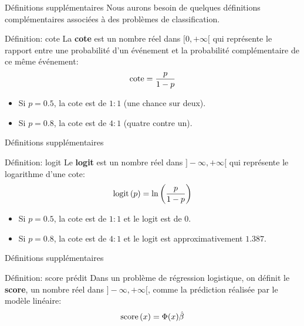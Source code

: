 \begin{frame}{Définitions supplémentaires}
	Nous aurons besoin de quelques définitions complémentaires associées à des problèmes de classification.
	\begin{block}{Définition: cote}
		La \textbf{cote} est un nombre réel dans $[0, +\infty[$ qui représente le rapport entre une probabilité d'un événement et la probabilité complémentaire de ce même événement:
		\begin{equation}
			\operatorname{cote} = \frac{p}{1 - p}
			\nonumber
		\end{equation}
	\end{block}
	\pause
	\begin{itemize}
		\item Si $p=0.5$, la cote est de $1:1$ (une chance sur deux).
		\item Si $p=0.8$, la cote est de $4:1$ (quatre contre un).
	\end{itemize}	
\end{frame}

\begin{frame}{Définitions supplémentaires}
	\begin{block}{Définition: logit}
		Le \textbf{logit} est un nombre réel dans $]-\infty, +\infty[$ qui représente le logarithme d'une cote:
		\begin{equation}
			\operatorname{logit}\left(p\right) = \ln{\left(\frac{p}{1 - p}\right)}
			\nonumber
		\end{equation}
	\end{block}
	\pause
	\begin{itemize}
		\item Si $p=0.5$, la cote est de $1:1$ et le logit est de $0$.
		\item Si $p=0.8$, la cote est de $4:1$ et le logit est approximativement $1.387$.
	\end{itemize}	
\end{frame}

\begin{frame}{Définitions supplémentaires}
	\begin{block}{Définition: score prédit}
		Dans un problème de régression logistique, on définit le \textbf{score}, un nombre réel dans $]-\infty, +\infty[$, comme la prédiction réalisée par le modèle linéaire:
		\begin{equation}
			\operatorname{score}\left(x\right) = \Phi(x) \hat{\beta}
			\nonumber
		\end{equation}
	\end{block}
\end{frame}

